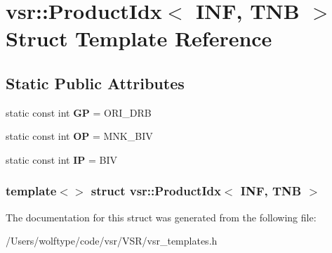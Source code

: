 \hypertarget{structvsr_1_1_product_idx_3_01_i_n_f_00_01_t_n_b_01_4}{\section{vsr\-:\-:Product\-Idx$<$ I\-N\-F, T\-N\-B $>$ Struct Template Reference}
\label{structvsr_1_1_product_idx_3_01_i_n_f_00_01_t_n_b_01_4}
}
\subsection*{Static Public Attributes}
\begin{DoxyCompactItemize}
\item 
\hypertarget{structvsr_1_1_product_idx_3_01_i_n_f_00_01_t_n_b_01_4_afc9534534f17d748af3d866a110e2574}{static const int {\bfseries G\-P} = O\-R\-I\-\_\-\-D\-R\-B}\label{structvsr_1_1_product_idx_3_01_i_n_f_00_01_t_n_b_01_4_afc9534534f17d748af3d866a110e2574}

\item 
\hypertarget{structvsr_1_1_product_idx_3_01_i_n_f_00_01_t_n_b_01_4_a67234332ac36745bf15bc15017a8afe1}{static const int {\bfseries O\-P} = M\-N\-K\-\_\-\-B\-I\-V}\label{structvsr_1_1_product_idx_3_01_i_n_f_00_01_t_n_b_01_4_a67234332ac36745bf15bc15017a8afe1}

\item 
\hypertarget{structvsr_1_1_product_idx_3_01_i_n_f_00_01_t_n_b_01_4_a8b24d24d074e8f846571cb3a3c6d924b}{static const int {\bfseries I\-P} = B\-I\-V}\label{structvsr_1_1_product_idx_3_01_i_n_f_00_01_t_n_b_01_4_a8b24d24d074e8f846571cb3a3c6d924b}

\end{DoxyCompactItemize}
\subsubsection*{template$<$$>$ struct vsr\-::\-Product\-Idx$<$ I\-N\-F, T\-N\-B $>$}



The documentation for this struct was generated from the following file\-:\begin{DoxyCompactItemize}
\item 
/\-Users/wolftype/code/vsr/\-V\-S\-R/vsr\-\_\-templates.\-h\end{DoxyCompactItemize}
